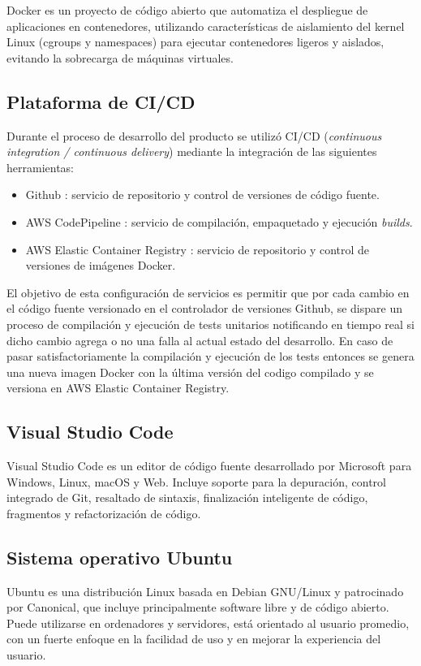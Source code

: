 Docker \cite{docker_website} es un proyecto de código abierto que automatiza el despliegue de aplicaciones en contenedores, utilizando características de aislamiento del kernel Linux (cgroups y namespaces) para ejecutar contenedores ligeros y aislados, evitando la sobrecarga de máquinas virtuales.





\subsection{Plataforma de CI/CD}
Durante el proceso de desarrollo del producto se utilizó CI/CD (\textit{continuous integration / continuous delivery}) mediante la integración de las siguientes herramientas:

\begin{itemize}
	\item Github \cite{SoftwareTool_Github}: servicio de repositorio y control de versiones de código fuente.
	\item AWS CodePipeline \cite{AWS_codePipeline}: servicio de compilación, empaquetado y ejecución \textit{builds}.
	\item AWS Elastic Container Registry \cite{aws_ECR}: servicio de repositorio y control de versiones de imágenes Docker.
\end{itemize}

El objetivo de esta configuración de servicios es permitir que por cada cambio en el código fuente versionado en el controlador de versiones Github, se dispare un proceso de compilación y ejecución de tests unitarios notificando en tiempo real si dicho cambio agrega o no una falla al actual estado del desarrollo. En caso de pasar satisfactoriamente la compilación y ejecución de los tests entonces se genera una nueva imagen Docker con la última versión del codigo compilado y se versiona en AWS Elastic Container Registry.

\subsection{Visual Studio Code}

Visual Studio Code \cite{vscode_website} es un editor de código fuente desarrollado por Microsoft para Windows, Linux, macOS y Web. Incluye soporte para la depuración, control integrado de Git, resaltado de sintaxis, finalización inteligente de código, fragmentos y refactorización de código.


\subsection{Sistema operativo Ubuntu}
Ubuntu \cite{ubuntu_website} es una distribución Linux basada en Debian GNU/Linux y patrocinado por Canonical, que incluye principalmente software libre y de código abierto. Puede utilizarse en ordenadores y servidores, está orientado al usuario promedio, con un fuerte enfoque en la facilidad de uso y en mejorar la experiencia del usuario.




